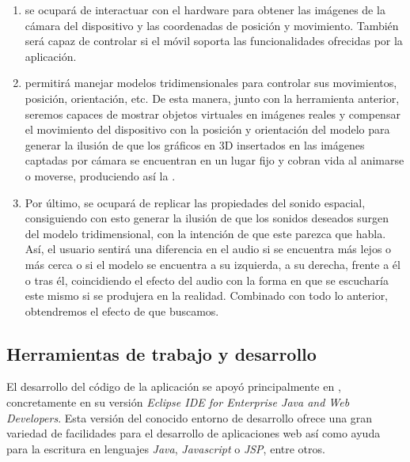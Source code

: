 \documentclass{subfiles}
\begin{document}
        \begin{enumerate}
            \item \webxr se ocupará de interactuar con el hardware para obtener las imágenes de la cámara del dispositivo y las coordenadas de posición y movimiento. También será capaz de controlar si el móvil soporta las funcionalidades ofrecidas por la aplicación.

            \item \threejs permitirá manejar modelos tridimensionales para controlar sus movimientos, posición, orientación, etc. De esta manera, junto con la herramienta anterior, seremos capaces de mostrar objetos virtuales en imágenes reales y compensar el movimiento del dispositivo con la posición y orientación del modelo para generar la ilusión de que los gráficos en 3D insertados en las imágenes captadas por cámara se encuentran en un lugar fijo y cobran vida al animarse o moverse, produciendo así la \ra.

            \item Por último, \resonanceaudio se ocupará de replicar las propiedades del sonido espacial, consiguiendo con esto generar la ilusión de que los sonidos deseados surgen del modelo tridimensional, con la intención de que este parezca que habla. Así, el usuario sentirá una diferencia en el audio si se encuentra más lejos o más cerca o si el modelo se encuentra a su izquierda, a su derecha, frente a él o tras él, coincidiendo el efecto del audio con la forma en que se escucharía este mismo si se produjera en la realidad. Combinado con todo lo anterior, obtendremos el efecto de \ra que buscamos.
        \end{enumerate}

        \subsection{Herramientas de trabajo y desarrollo}
        \label{sec:herramientas_de_desarrollo}

        El desarrollo del código de la aplicación se apoyó principalmente en \eclipse \cite{web:eclipse}, concretamente en su versión \textit{Eclipse IDE for Enterprise Java and Web Developers}. Esta versión del conocido entorno de desarrollo ofrece una gran variedad de facilidades para el desarrollo de aplicaciones web así como ayuda para la escritura en lenguajes \textit{Java}, \textit{Javascript} o \textit{JSP}, entre otros.
\end{document}
